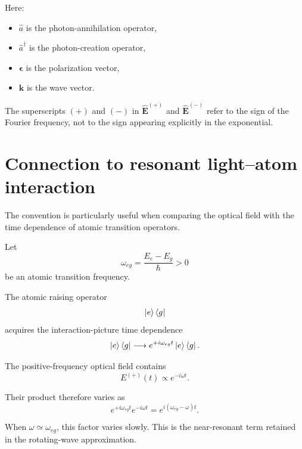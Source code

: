 \documentclass[11pt]{article}
\begin{document}
Here:
\begin{itemize}[leftmargin=2em]
    \item $\hat a$ is the photon-annihilation operator,
    \item $\hat a^\dagger$ is the photon-creation operator,
    \item $\bm\epsilon$ is the polarization vector,
    \item $\bm k$ is the wave vector.
\end{itemize}

The superscripts $(+)$ and $(-)$ in
$\widehat{\bm E}^{(+)}$ and $\widehat{\bm E}^{(-)}$
refer to the sign of the Fourier frequency, not to the sign appearing explicitly in the exponential.

\section{Connection to resonant light--atom interaction}

The convention is particularly useful when comparing the optical field with the time dependence of atomic transition operators.

Let
\begin{equation}
\omega_{eg}
=
\frac{E_e-E_g}{\hbar}
>0
\label{eq:transition-frequency}
\end{equation}
be an atomic transition frequency.

The atomic raising operator
\begin{equation}
\ket{e}\bra{g}
\end{equation}
acquires the interaction-picture time dependence
\begin{equation}
\ket{e}\bra{g}
\longrightarrow
e^{+i\omega_{eg}t}
\ket{e}\bra{g}.
\label{eq:raising-time}
\end{equation}

The positive-frequency optical field contains
\begin{equation}
E^{(+)}(t)\propto e^{-i\omega t}.
\label{eq:optical-positive-time}
\end{equation}

Their product therefore varies as
\begin{equation}
e^{+i\omega_{eg}t}
e^{-i\omega t}
=
e^{i(\omega_{eg}-\omega)t}.
\label{eq:near-resonant-factor}
\end{equation}

When $\omega\simeq\omega_{eg}$, this factor varies slowly. This is the near-resonant term retained in the rotating-wave approximation.
\end{document}
